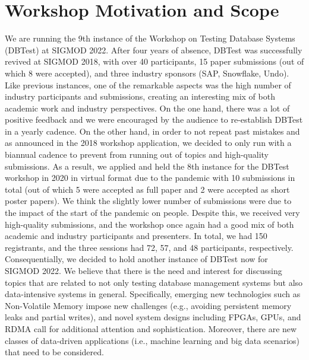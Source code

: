 \documentclass[sigconf]{acmart}
\begin{document}
\maketitle

\section{Workshop Motivation and Scope}
We are running the 9th instance of the Workshop on Testing Database Systems (DBTest) at SIGMOD 2022.
After four years of absence, DBTest was successfully revived at SIGMOD 2018, with over 40 participants, 15 paper submissions (out of which 8 were accepted), and three industry sponsors (SAP, Snowflake, Undo).
Like previous instances, one of the remarkable aspects was the high number of industry participants and submissions, creating an interesting mix of both academic work and industry perspectives.
On the one hand, there was a lot of positive feedback and we were encouraged by the audience to re-establish DBTest in a yearly cadence.
On the other hand, in order to not repeat past mistakes and as announced in the 2018 workshop application, we decided to only run with a biannual cadence to prevent from running out of topics and high-quality submissions.
As a result, we applied and held the 8th instance for the DBTest workshop in 2020 in virtual format due to the pandemic with 10 submissions in total (out of which 5 were accepted as full paper and 2 were accepted as short poster papers).
We think the slightly lower number of submissions were due to the impact of the start of the pandemic on people.
Despite this, we received very high-quality submissions, and the workshop once again had a good mix of both academic and industry participants and presenters. In total, we had 150 registrants, and the three sessions had 72, 57, and 48 participants, respectively.
Consequentially, we decided to hold another instance of DBTest now for SIGMOD 2022.
We believe that there is the need and interest for discussing topics that are related to not only testing database management systems but also data-intensive systems in general.
Specifically, emerging new technologies such as Non-Volatile Memory impose new challenges (e.g., avoiding persistent memory leaks and partial writes), and novel system designs including FPGAs, GPUs, and RDMA call for additional attention and sophistication.
Moreover, there are new classes of data-driven applications (i.e., machine learning and big data scenarios) that need to be considered.
\end{document}
